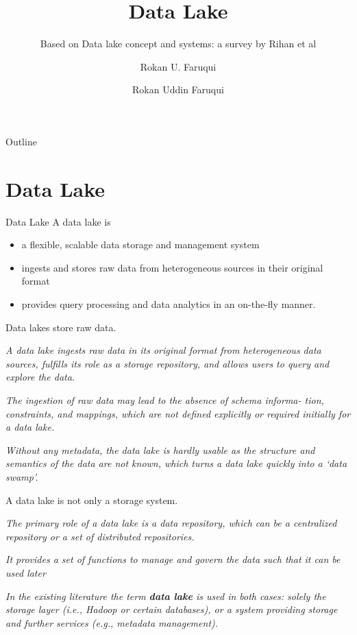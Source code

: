 \documentclass[xcolor=x11names,compress, 24pt]{beamer}
\title{\sc Data Lake}
\subtitle{  Based on Data lake concept and systems: a survey by Rihan et al}
\author{Rokan U. Faruqui }
\author{\sc Rokan Uddin Faruqui }
\institute[CSE, CU]{Professor \\ Dept of Computer Science and Engineering \\ University of Chittaong, Bangladesh\\ Email: \textit{rokan@cu.ac.bd}}
\date{} %
\renewcommand{\(}{\begin{columns}}
\renewcommand{\)}{\end{columns}}
\newcommand{\<}[1]{\begin{column}{#1}}
\renewcommand{\>}{\end{column}}
\begin{document}
\begin{frame}[plain]
\titlepage
\end{frame}

\begin{frame}{Outline}
\tableofcontents
\end{frame}
 \section{Data Lake}
 \begin{frame}{Data Lake}
 	A data lake is
 \begin{itemize}
 	\item  a flexible, scalable data storage and management system \vspace{.25cm}
 	
    \item ingests and stores raw data from heterogeneous sources in their original format  \vspace{.25cm}
    
    \item provides query processing and data analytics in an on-the-fly manner.  \vspace{.25cm}
 	
 	 
 \end{itemize}
 \end{frame}


 \begin{frame}{Data lakes store raw data.}
 	
 \emph{A data lake ingests raw data in its original format from heterogeneous data sources, fulfills its role as a storage repository, and allows users to query and explore the data.} \vspace{.25cm}
 
 \emph{The ingestion of raw data may lead to the absence of schema informa- tion, constraints, and mappings, which are not defined explicitly or required initially for a data lake.}\vspace{.25cm}
 
 \emph{ Without any metadata, the data lake is hardly usable as the structure and semantics of the data are not known, which turns a data lake quickly into a ‘data swamp’.}\vspace{.25cm}
\end{frame}


 \begin{frame}{A data lake is not only a storage system.}
	
	\emph{The primary role of a data lake is a data repository, which can be a centralized repository or a set of distributed repositories.} \vspace{.25cm}
	
	\emph{It provides a set of functions to manage and govern the data such that it can be used later}\vspace{.25cm}
	
	\emph{ In the existing literature the term \textbf{data lake} is used in both cases: solely the storage layer (i.e., Hadoop or certain databases), or a system providing storage and further services (e.g., metadata management).}\vspace{.25cm}
\end{frame}
\end{document}
